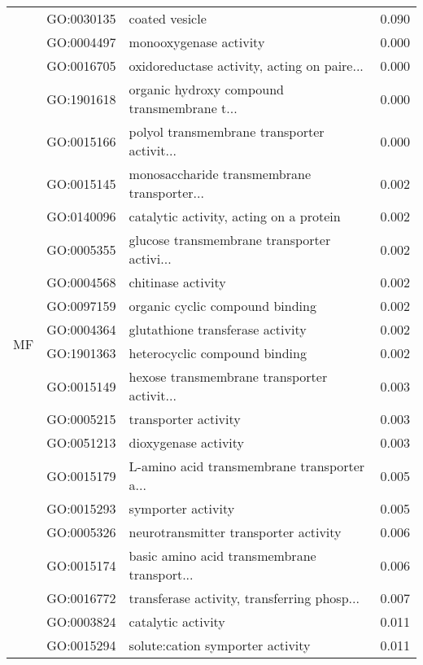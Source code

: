 \begin{longtable}{lllr}
   & GO:0030135 &                               coated vesicle &         0.090 \\
\cline{1-4}
\multirow{48}{*}{MF} & GO:0004497 &                       monooxygenase activity &         0.000 \\
   & GO:0016705 &  oxidoreductase activity, acting on paire... &         0.000 \\
   & GO:1901618 &  organic hydroxy compound transmembrane t... &         0.000 \\
   & GO:0015166 &  polyol transmembrane transporter activit... &         0.000 \\
   & GO:0015145 &  monosaccharide transmembrane transporter... &         0.002 \\
   & GO:0140096 &      catalytic activity, acting on a protein &         0.002 \\
   & GO:0005355 &  glucose transmembrane transporter activi... &         0.002 \\
   & GO:0004568 &                           chitinase activity &         0.002 \\
   & GO:0097159 &              organic cyclic compound binding &         0.002 \\
   & GO:0004364 &             glutathione transferase activity &         0.002 \\
   & GO:1901363 &                heterocyclic compound binding &         0.002 \\
   & GO:0015149 &  hexose transmembrane transporter activit... &         0.003 \\
   & GO:0005215 &                         transporter activity &         0.003 \\
   & GO:0051213 &                         dioxygenase activity &         0.003 \\
   & GO:0015179 &  L-amino acid transmembrane transporter a... &         0.005 \\
   & GO:0015293 &                           symporter activity &         0.005 \\
   & GO:0005326 &        neurotransmitter transporter activity &         0.006 \\
   & GO:0015174 &  basic amino acid transmembrane transport... &         0.006 \\
   & GO:0016772 &  transferase activity, transferring phosp... &         0.007 \\
   & GO:0003824 &                           catalytic activity &         0.011 \\
   & GO:0015294 &             solute:cation symporter activity &         0.011 \\

\end{longtable}
